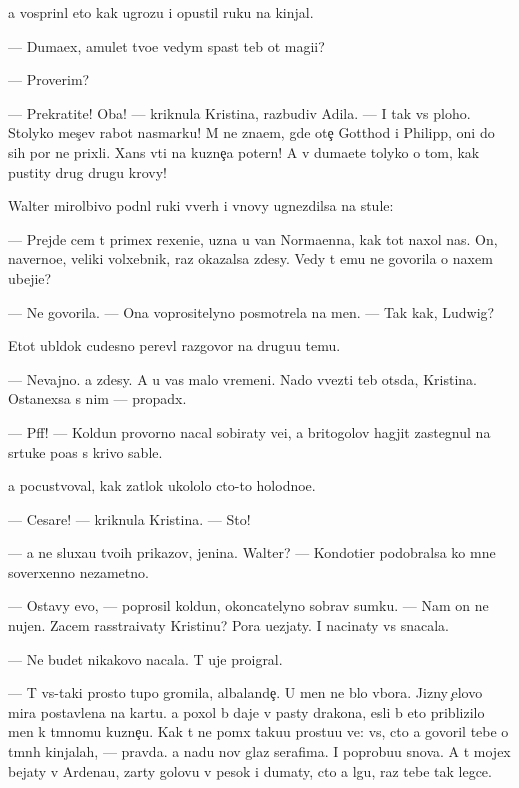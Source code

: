 \documentclass[10pt]{book}
\begin{document}
{\Y}a vosprin{\ia}l eto kak ugrozu i opustil ruku na kinjal.

— Duma{\y}ex, amulet tvo{\y}e{\y} vedym{\yi} spas{\e}t teb{\ia} ot magi{\y}i?

— Proverim?

— Prekratite! Oba! — kriknula Kristina, razbudiv Adila. — I tak vs{\e} ploho. Stolyko mes{\ia}{\c}ev rabot{\yi} nasmarku! M{\yi} ne zna{\y}em, gde ote{\c} Gotthod i Philipp, oni do sih por ne prixli. Xans v{\yi}{\y}ti na kuzne{\c}a poter{\ia}n! A v{\yi} duma{\y}ete tolyko o tom, kak pustity drug drugu krovy!

Walter mirol{\io}bivo podn{\ia}l ruki vverh i vnovy ugnezdilsa na stule:

— Prejde cem t{\yi} primex rexeni{\y}e, uzna{\y} u van Normaenna, kak tot naxol nas. On, naverno{\y}e, veliki{\y} volxebnik, raz okazalsa zdesy. Vedy t{\yi} {\y}emu ne govorila o naxem ubeji{\x}e?

— Ne govorila. — Ona voprositelyno posmotrela na men{\ia}. — Tak kak, Ludwig?

Etot ubl{\io}\-dok cudesno perev{\e}l razgovor na drugu{\y}u temu.

— Nevajno. {\Y}a zdesy. A u vas malo vremeni. Nado v{\yi}vezti teb{\ia} ots{\io}da, Kristina. Ostanexsa s nim — propad{\e}x.

— Pff! — Koldun provorno nacal sobiraty ve{\x}i, a britogolov{\yi}{\y} hagjit zastegnul na s{\io}rtuke po{\y}as s krivo{\y} sable{\y}.

{\Y}a pocustvoval, kak zat{\yi}lok ukololo cto-to holodno{\y}e.

— Cesare! — kriknula Kristina. — Sto{\y}!

— {\Y}a ne sluxa{\y}u tvo{\y}ih prikazov, jen{\x}ina. Walter? — Kondotier podobralsa ko mne soverxenno nezametno.

— Ostavy {\y}evo, — poprosil koldun, okoncatelyno sobrav sumku. — Nam on ne nujen. Zacem rasstra{\y}ivaty Kristinu? Pora u{\y}ezjaty. I nacinaty vs{\e} snacala.

— Ne budet nikakovo nacala. T{\yi} uje proigral.

— T{\yi} vs{\e}-taki prosto tupo{\y} gromila, albalande{\c}. U men{\ia} ne b{\yi}lo v{\yi}bora. Jizny {\c}elovo mira postavlena na kartu. {\Y}a poxol b{\yi} daje v pasty drakona, {\y}esli b{\yi} eto priblizilo men{\ia} k t{\e}mnomu kuzne{\c}u. Kak t{\yi} ne po{\y}m{\e}x taku{\y}u prostu{\y}u ve{\x}: vs{\e}, cto {\y}a govoril tebe o t{\e}mn{\yi}h kinjalah, — pravda. {\Y}a na{\y}du nov{\yi}{\y} glaz serafima. I poprobu{\y}u snova. A t{\yi} mojex bejaty v Ardenau, zar{\yi}ty golovu v pesok i dumaty, cto {\y}a lgu, raz tebe tak legce.
\end{document}
